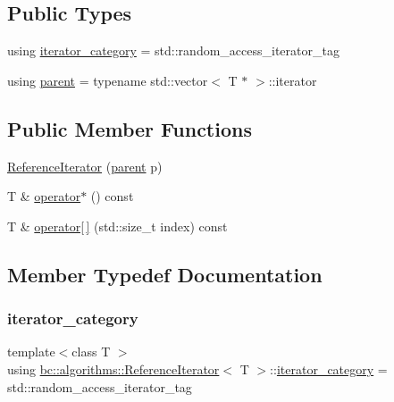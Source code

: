 \subsection*{Public Types}
\begin{DoxyCompactItemize}
\item 
using \hyperlink{structbc_1_1algorithms_1_1ReferenceIterator_a1ee3bc18d1efac26e534a6a771717085}{iterator\+\_\+category} = std\+::random\+\_\+access\+\_\+iterator\+\_\+tag
\item 
using \hyperlink{structbc_1_1algorithms_1_1ReferenceIterator_a3b90afcf3701f526f238edfb19126696}{parent} = typename std\+::vector$<$ T $\ast$ $>$\+::iterator
\end{DoxyCompactItemize}
\subsection*{Public Member Functions}
\begin{DoxyCompactItemize}
\item 
\hyperlink{structbc_1_1algorithms_1_1ReferenceIterator_a83549088ef41105e1699406a1b3f3c76}{Reference\+Iterator} (\hyperlink{structbc_1_1algorithms_1_1ReferenceIterator_a3b90afcf3701f526f238edfb19126696}{parent} p)
\item 
T \& \hyperlink{structbc_1_1algorithms_1_1ReferenceIterator_a900a5ec835d64f816baceec5ba070bf3}{operator$\ast$} () const
\item 
T \& \hyperlink{structbc_1_1algorithms_1_1ReferenceIterator_ad375c7d29fbe337db734fc953a185a4a}{operator\mbox{[}$\,$\mbox{]}} (std\+::size\+\_\+t index) const
\end{DoxyCompactItemize}


\subsection{Member Typedef Documentation}
\mbox{\label{structbc_1_1algorithms_1_1ReferenceIterator_a1ee3bc18d1efac26e534a6a771717085}} 
\subsubsection{\texorpdfstring{iterator\+\_\+category}{iterator\_category}}
{\footnotesize\ttfamily template$<$class T $>$ \\
using \hyperlink{structbc_1_1algorithms_1_1ReferenceIterator}{bc\+::algorithms\+::\+Reference\+Iterator}$<$ T $>$\+::\hyperlink{structbc_1_1algorithms_1_1ReferenceIterator_a1ee3bc18d1efac26e534a6a771717085}{iterator\+\_\+category} =  std\+::random\+\_\+access\+\_\+iterator\+\_\+tag}

